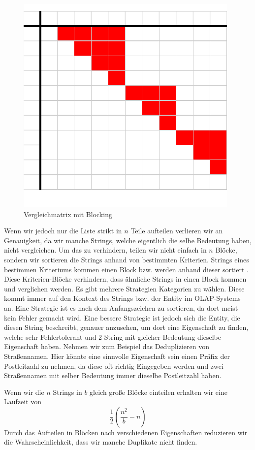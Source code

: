 \documentclass[sigconf]{acmart}
\begin{document}
\begin{figure}[htbp]
  \centering
  \includegraphics{table2.pdf}
  \caption{Vergleichmatrix mit Blocking}
  \label{abb:matrixblock}
\end{figure}

Wenn wir jedoch nur die Liste strikt in $n$
Teile aufteilen verlieren wir an Genauigkeit, da wir
manche Strings, welche eigentlich die selbe Bedeutung haben,
nicht vergleichen.
Um das zu verhindern, teilen wir nicht einfach in $n$
Blöcke, sondern wir sortieren die Strings anhand von
bestimmten Kriterien. Strings eines bestimmen Kriteriums kommen
einen Block bzw. werden anhand dieser sortiert \cite[Vlg. S. 11]{elmagarmid1}.
Diese Kriterien-Blöcke verhindern, dass
ähnliche Strings in einen Block kommen
und verglichen werden.
Es gibt mehrere Strategien Kategorien zu wählen. Diese
kommt immer auf den Kontext des Strings bzw. der Entity 
im OLAP-Systems an.
Eine Strategie ist es nach dem Anfangszeichen zu
sortieren, da dort meist kein Fehler gemacht wird.
Eine bessere Strategie ist jedoch sich die Entity,
die diesen String beschreibt, genauer anzusehen,
um dort eine Eigenschaft zu finden, welche sehr
Fehlertolerant und 2 String mit gleicher Bedeutung
dieselbe Eigenschaft haben.
Nehmen wir zum Beispiel das Deduplizieren von
Straßennamen. Hier könnte eine sinnvolle
Eigenschaft sein einen Präfix der
Postleitzahl zu nehmen, da diese oft richtig
Eingegeben werden und zwei Straßennamen mit selber
Bedeutung immer dieselbe Postleitzahl haben.

Wenn wir die $n$ Strings in $b$ gleich große Blöcke
einteilen erhalten wir eine Laufzeit von
$$\frac{1}{2} (\frac{n^2}{b}-n)$$
Durch das Aufteilen in Blöcken nach verschiedenen
Eigenschaften reduzieren wir die Wahrscheinlichkeit,
dass wir manche Duplikate nicht finden.
\end{document}

